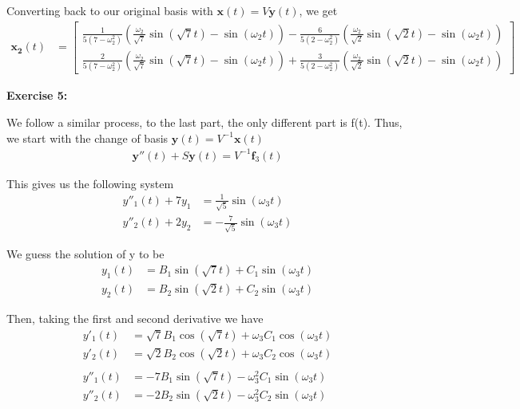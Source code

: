 \documentclass[12pt]{article}
\begin{document}
Converting back to our original basis with $\mathbf{x}(t) = V\mathbf{y}(t)$, we get
\begin{align*}
    \mathbf{x_2}(t) & = \begin{bmatrix}
                            \frac{1}{5(7-\omega_2^2)}(\frac{\omega_2}{\sqrt{7}}\sin(\sqrt{7}t) - \sin(\omega_{2}t)) - \frac{6}{5(2-\omega_2^2)}(\frac{\omega_2}{\sqrt{2}}\sin(\sqrt{2}t) - \sin(\omega_{2}t)) \\
                            \frac{2}{5(7-\omega_2^2)}(\frac{\omega_2}{\sqrt{7}}\sin(\sqrt{7}t) - \sin(\omega_{2}t)) + \frac{3}{5(2-\omega_2^2)}(\frac{\omega_2}{\sqrt{2}}\sin(\sqrt{2}t) - \sin(\omega_{2}t))
                        \end{bmatrix}
\end{align*}

\noindent{}\textbf{Exercise 5:}

We follow a similar process, to the last part, the only different part is f(t). Thus, we start with the change of basis $\mathbf{y}(t) = V^{-1}\mathbf{x}(t)$
\begin{align*}
    \mathbf{y}''(t) + S\mathbf{y}(t) = V^{-1}\mathbf{f}_3(t)
\end{align*}

This gives us the following system
\begin{align*}
    y''_1(t) + 7y_1 & = \frac{1}{\sqrt{5}} \sin(\omega_3t)  \\
    y''_2(t) + 2y_2 & = -\frac{7}{\sqrt{5}} \sin(\omega_3t)
\end{align*}

We guess the solution of y to be
\begin{align*}
    y_1(t) & =  B_1 \sin(\sqrt{7}t) + C_1 \sin(\omega_{3}t) \\
    y_2(t) & =  B_2 \sin(\sqrt{2}t) + C_2 \sin(\omega_{3}t)
\end{align*}

Then, taking the first and second derivative we have
\begin{align*}
    y'_1(t)  & =  \sqrt{7}B_1\cos(\sqrt{7}t) + \omega_{3} C_1 \cos(\omega_{3}t) \\
    y'_2(t)  & =  \sqrt{2}B_2\cos(\sqrt{2}t) + \omega_{3} C_2 \cos(\omega_{3}t) \\\\
    y''_1(t) & =  - 7B_1 \sin(\sqrt{7}t) - \omega_{3}^2 C_1 \sin(\omega_{3}t)   \\
    y''_2(t) & =  - 2B_2 \sin(\sqrt{2}t) - \omega_{3}^2 C_2 \sin(\omega_{3}t)
\end{align*}
\end{document}
